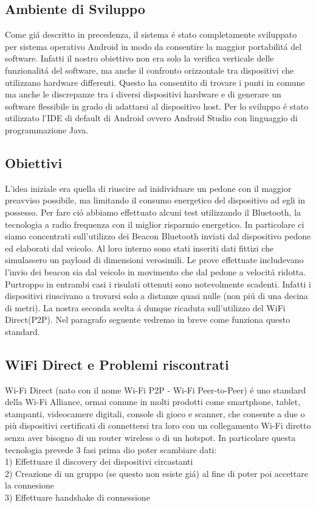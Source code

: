 \documentclass[conference]{IEEEtran}
\begin{document}
\subsection{Ambiente di Sviluppo}
Come gi\'a descritto in precedenza, il sistema \'e stato completamente sviluppato per sistema operativo Android in modo da consentire la maggior portabilit\'a del software. Infatti il nostro obiettivo non era solo la verifica verticale delle funzionalit\'a del software, ma anche il confronto orizzontale tra dispositivi che utilizzano hardware differenti. Questo ha consentito di trovare i punti in comune ma anche le discrepanze tra i diversi dispositivi hardware e di generare un software flessibile in grado di adattarsi al dispositivo host. Per lo sviluppo  \'e stato utilizzato l'IDE di default di Android ovvero Android Studio con linguaggio di programmazione Java.

\subsection{Obiettivi}
L'idea iniziale era quella di riuscire ad inidividuare un pedone con il maggior preavviso possibile, ma limitando il consumo energetico del dispositivo ad egli in possesso. Per fare ci\'o abbiamo effettuato alcuni test utilizzando il Bluetooth, la tecnologia a radio frequenza con il miglior risparmio energetico. In particolare ci siamo concentrati sull'utilizzo dei Beacon Bluetooth inviati dal dispositivo pedone ed elaborati dal veicolo. Al loro interno sono stati inseriti dati fittizi che simulassero un payload di dimensioni verosimili. Le prove effettuate includevano l'invio dei beacon sia dal veicolo in movimento che dal pedone a velocit\'a ridotta. Purtroppo in entrambi casi i risulati ottenuti sono notevolmente scadenti. Infatti i dispositivi riuscivano a trovarsi solo a distanze quasi nulle (non pi\'u di una decina di metri). La nostra seconda scelta \'a dunque ricaduta sull'utilizzo del WiFi Direct(P2P). Nel paragrafo seguente vedremo in breve come funziona questo standard.

\subsection{WiFi Direct e Problemi riscontrati}
Wi-Fi Direct (nato con il nome Wi-Fi P2P - Wi-Fi Peer-to-Peer) \'e uno standard della Wi-Fi Alliance, ormai comune in molti prodotti come smartphone, tablet, stampanti, videocamere digitali, console di gioco e scanner, che consente a due o più dispositivi certificati di connettersi tra loro con un collegamento Wi-Fi diretto senza aver bisogno di un router wireless o di un hotspot. In particolare questa tecnologia prevede 3 fasi prima dio poter scambiare dati:
\\
1) Effettuare il discovery dei dispositivi circastanti
\\
2) Creazione di un gruppo (se questo non esiste gi\'a) al fine di poter poi accettare la connesione
\\
3) Effettuare handshake di connessione
\end{document}
